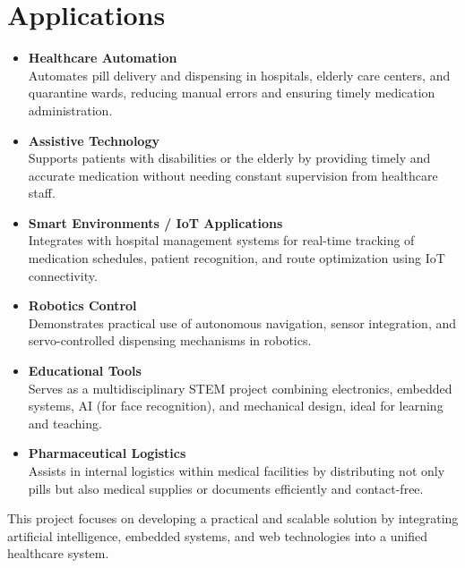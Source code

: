 \section{Applications}

\begin{itemize}
    \item \textbf{Healthcare Automation} \\
    Automates pill delivery and dispensing in hospitals, elderly care centers, and quarantine wards, reducing manual errors and ensuring timely medication administration.

    \item \textbf{Assistive Technology} \\
    Supports patients with disabilities or the elderly by providing timely and accurate medication without needing constant supervision from healthcare staff.

    \item \textbf{Smart Environments / IoT Applications} \\
    Integrates with hospital management systems for real-time tracking of medication schedules, patient recognition, and route optimization using IoT connectivity.

    \item \textbf{Robotics Control} \\
    Demonstrates practical use of autonomous navigation, sensor integration, and servo-controlled dispensing mechanisms in robotics.

    \item \textbf{Educational Tools} \\
    Serves as a multidisciplinary STEM project combining electronics, embedded systems, AI (for face recognition), and mechanical design, ideal for learning and teaching.

    \item \textbf{Pharmaceutical Logistics} \\
    Assists in internal logistics within medical facilities by distributing not only pills but also medical supplies or documents efficiently and contact-free.
\end{itemize}

This project focuses on developing a practical and scalable solution by integrating artificial intelligence, embedded systems, and web technologies into a unified healthcare system.